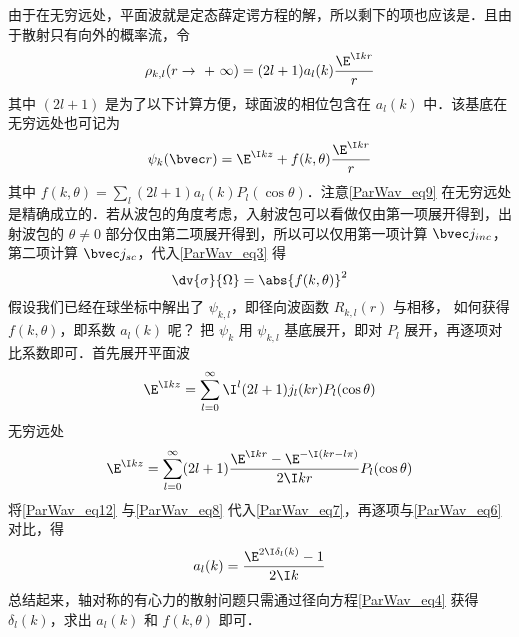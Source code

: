 由于在无穷远处，平面波就是定态薛定谔方程的解，所以剩下的项也应该是．且由于散射只有向外的概率流，令
\begin{equation}\label{ParWav_eq8}
{\rho_{k,l}}(r \to {\text{ + }}\infty ) = (2l + 1){a_l}(k)\frac{\E^{\I kr}}{r}
\end{equation}
其中 $(2l + 1)$ 是为了以下计算方便，球面波的相位包含在 ${a_l}(k)$ 中．该基底在无穷远处也可记为
\begin{equation}\label{ParWav_eq9}
\psi_k(\bvec r) = \E^{\I kz} + f(k,\theta )\frac{\E^{\I kr}}{r}
\end{equation}
其中 $f(k,\theta) = \sum_l (2l + 1) a_l(k) P_l(\cos \theta)$．注意\autoref{ParWav_eq9} 在无穷远处是精确成立的．若从波包的角度考虑，入射波包可以看做仅由第一项展开得到，出射波包的 $\theta  \ne 0$ 部分仅由第二项展开得到，所以可以仅用第一项计算 $\bvec j_{inc}$， 第二项计算 $\bvec j_{sc}$，代入\autoref{ParWav_eq3} 得
\begin{equation}
\dv{\sigma }{\Omega} = \abs{f(k,\theta)}^2
\end{equation}
假设我们已经在球坐标中解出了 $\psi_{k,l}$，即径向波函数 $R_{k,l}(r)$ 与相移， 如何获得 $f(k,\theta )$，即系数 $a_l(k)$ 呢？ 把 $\psi_k$ 用 $\psi_{k,l}$ 基底展开，即对 $P_l$ 展开，再逐项对比系数即可．首先展开平面波
\begin{equation}
\E^{\I kz} = \sum_{l = 0}^\infty  \I^l (2l + 1) j_l(kr) P_l(\cos \theta)
\end{equation}
无穷远处
\begin{equation}\label{ParWav_eq12}
\E^{\I kz} = \sum_{l=0}^\infty  (2l + 1)\frac{\E^{\I kr} - \E^{-\I(kr - l\pi)}}{2\I kr} P_l(\cos \theta)
\end{equation}
将\autoref{ParWav_eq12} 与\autoref{ParWav_eq8} 代入\autoref{ParWav_eq7}，再逐项与\autoref{ParWav_eq6} 对比，得
\begin{equation}
a_l(k) = \frac{\E^{2\I \delta_l(k)} - 1}{2\I k}
\end{equation}
总结起来，轴对称的有心力的散射问题只需通过径向方程\autoref{ParWav_eq4} 获得 $\delta_l (k)$，求出 $a_l(k)$ 和 $f(k, \theta)$ 即可．

